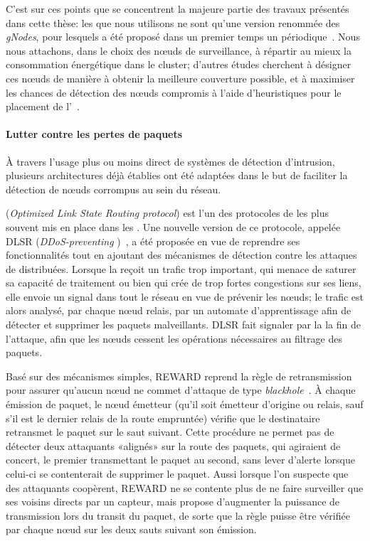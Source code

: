 C'est sur ces points que se concentrent la majeure partie des travaux présentés dans cette thèse: les \cns que nous utilisons ne sont qu'une version renommée des \textit{gNodes}, pour lesquels a été proposé dans un premier temps un  périodique~\cite{GMT12}.
Nous nous attachons, dans le choix des nœuds de surveillance, à répartir au mieux la consommation énergétique dans le cluster; d'autres études cherchent à désigner ces nœuds de manière à obtenir la meilleure couverture possible, et à maximiser les chances de détection des nœuds compromis à l'aide d'heuristiques pour le placement de l'\IDS~\cite{INK09}.

        \paragraph{Lutter contre les pertes de paquets}
À travers l'usage plus ou moins direct de systèmes de détection d'intrusion, plusieurs architectures déjà établies ont été adaptées dans le but de faciliter la détection de nœuds corrompus au sein du réseau.

\olsr (\textit{Optimized Link State Routing protocol}) est l'un des protocoles de  les plus souvent mis en place dans les \rcs.
Une nouvelle version de ce protocole, appelée DLSR (\textit{DDoS-preventing \olsr})~\cite{MKASF10}, a été proposée en vue de reprendre ses fonctionnalités tout en ajoutant des mécanismes de détection contre les attaques de \dds distribuées.
Lorsque la \sdb reçoit un trafic trop important, qui menace de saturer sa capacité de traitement ou bien qui crée de trop fortes congestions sur ses liens, elle envoie un signal dans tout le réseau en vue de prévenir les nœuds; le trafic est alors analysé, par chaque nœud relais, par un automate d'apprentissage afin de détecter et supprimer les paquets malveillants.
DLSR fait signaler par la \sdb la fin de l'attaque, afin que les nœuds cessent les opérations nécessaires au filtrage des paquets.

Basé sur des mécanismes simples, REWARD reprend la règle de retransmission pour assurer qu'aucun nœud ne commet d'attaque de type \textit{blackhole}~\cite{Kar05}.
À chaque émission de paquet, le nœud émetteur (qu'il soit émetteur d'origine ou relais, sauf s'il est le dernier relais de la route empruntée) vérifie que le destinataire retransmet le paquet sur le saut suivant.
Cette procédure ne permet pas de détecter deux attaquants «alignés» sur la route des paquets, qui agiraient de concert, le premier transmettant le paquet au second, sans lever d'alerte lorsque celui-ci se contenterait de supprimer le paquet.
Aussi lorsque l'on suspecte que des attaquants coopèrent, REWARD ne se contente plus de ne faire surveiller que ses voisins directs par un capteur, mais propose d'augmenter la puissance de transmission lors du transit du paquet, de sorte que la règle puisse être vérifiée par chaque nœud sur les deux sauts suivant son émission.

